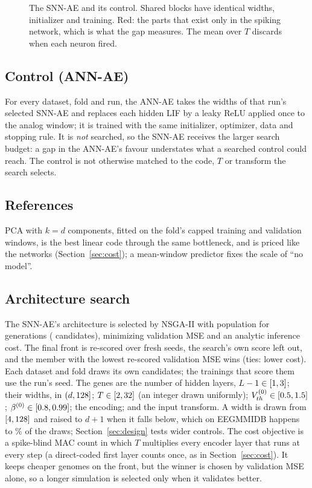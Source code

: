 \documentclass[conference]{IEEEtran}
\begin{document}
\begin{figure}[!t]
  \centering
  
  \caption{The SNN-AE and its control. Shared blocks have identical widths, initializer and
  training. Red: the parts that exist only in the spiking network, which is what the gap
  measures. The mean over $T$ discards when each neuron fired.}
  \label{fig:matched}
\end{figure}

\subsection{Control (ANN-AE)}
\par For every dataset, fold and run, the ANN-AE takes the widths of that run's selected
SNN-AE and replaces each hidden LIF by a leaky ReLU applied once to the analog window; it is
trained with the same initializer, optimizer, data and stopping rule. It is \emph{not}
searched, so the SNN-AE receives the larger search budget: a gap in the ANN-AE's favour
understates what a searched control could reach. The control is not otherwise matched to the
code, $T$ or transform the search selects.

\subsection{References}
\par PCA with $k=d$ components, fitted on the fold's capped training and validation windows,
is the best linear code through the same bottleneck, and is priced like the networks
(Section~\ref{sec:cost}); a mean-window predictor fixes the scale of ``no model''.

\subsection{Architecture search}
\label{sec:search}
\par The SNN-AE's architecture is selected by NSGA-II \cite{deb2002fast} with population
\cfgGaPop{} for \cfgGaGen{} generations (\cfgGaEvals{} candidates), minimizing validation
MSE and an analytic inference cost. The final front is re-scored over \cfgGaWinnerSeeds{}
fresh seeds, the search's own score left out, and the member with the lowest re-scored
validation MSE wins (ties: lower cost). Each dataset and fold draws its own candidates; the
trainings that score them use the run's seed. The genes are the number of hidden layers,
$L-1\in[1, 3]$; their widths, in $(d,128]$; $T\in[2,32]$ (an
integer drawn uniformly); $V_{th}^{(0)}\in[0.5, 1.5]$; $\beta^{(0)}\in[0.8, 0.99]$; the encoding;
and the input transform. A width is drawn from $[4,128]$ and raised to
$d+1$ when it falls below, which on EEGMMIDB happens to \cfgWidthFloorShareEegmmidb\% of the
draws; Section~\ref{sec:design} tests wider controls. The cost objective is a spike-blind MAC
count in which $T$ multiplies every encoder layer that runs at every step (a direct-coded first
layer counts once, as in Section~\ref{sec:cost}). It keeps cheaper genomes on the front, but the
winner is chosen by validation MSE alone, so a longer simulation is selected only when it
validates better.
\end{document}
